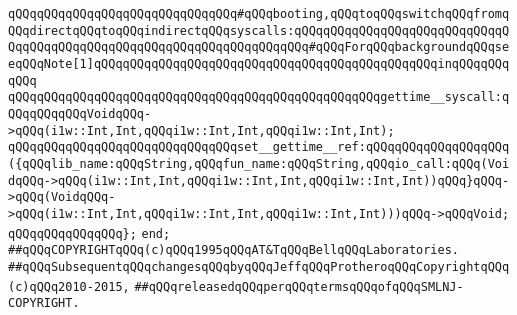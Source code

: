 \verb|qQQqqQQqqQQqqQQqqQQqqQQqqQQqqQQq#qQQqbooting,qQQqtoqQQqswitchqQQqfromqQQqdirectqQQqtoqQQqindirectqQQqsyscalls:qQQqqQQqqQQqqQQqqQQqqQQqqQQqqQQqqQQqqQQqqQQqqQQqqQQqqQQqqQQqqQQqqQQqqQQq#qQQqForqQQqbackgroundqQQqseeqQQqNote[1]qQQqqQQqqQQqqQQqqQQqqQQqqQQqqQQqqQQqqQQqqQQqqQQqinqQQqqQQqqQQq|\newline
\newline
\verb|qQQqqQQqqQQqqQQqqQQqqQQqqQQqqQQqqQQqqQQqqQQqqQQqqQQqgettime__syscall:qQQqqQQqqQQqVoidqQQq->qQQq(i1w::Int,Int,qQQqi1w::Int,Int,qQQqi1w::Int,Int);|\newline
\verb|qQQqqQQqqQQqqQQqqQQqqQQqqQQqqQQqset__gettime__ref:qQQqqQQqqQQqqQQqqQQq({qQQqlib_name:qQQqString,qQQqfun_name:qQQqString,qQQqio_call:qQQq(VoidqQQq->qQQq(i1w::Int,Int,qQQqi1w::Int,Int,qQQqi1w::Int,Int))qQQq}qQQq->qQQq(VoidqQQq->qQQq(i1w::Int,Int,qQQqi1w::Int,Int,qQQqi1w::Int,Int)))qQQq->qQQqVoid;|\newline
\verb|qQQqqQQqqQQqqQQq};|\newline
\verb|end;|\newline
\newline
\verb|##qQQqCOPYRIGHTqQQq(c)qQQq1995qQQqAT&TqQQqBellqQQqLaboratories.|\newline
\verb|##qQQqSubsequentqQQqchangesqQQqbyqQQqJeffqQQqProtheroqQQqCopyrightqQQq(c)qQQq2010-2015,|\newline
\verb|##qQQqreleasedqQQqperqQQqtermsqQQqofqQQqSMLNJ-COPYRIGHT.|\newline

